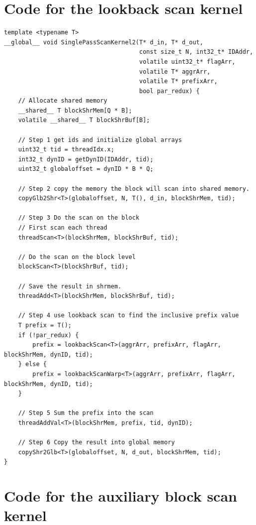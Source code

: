 \documentclass[twocolumn]{article}
\begin{document}
\newpage

\section{Code for the lookback scan kernel}

\begin{lstlisting}[caption=Lookback kernel,label=lst:lookbackKernel]
template <typename T>
__global__ void SinglePassScanKernel2(T* d_in, T* d_out,
                                      const size_t N, int32_t* IDAddr,
                                      volatile uint32_t* flagArr,
                                      volatile T* aggrArr,
                                      volatile T* prefixArr,
                                      bool par_redux) {
    // Allocate shared memory
    __shared__ T blockShrMem[Q * B];
    volatile __shared__ T blockShrBuf[B];

    // Step 1 get ids and initialize global arrays
    uint32_t tid = threadIdx.x;
    int32_t dynID = getDynID(IDAddr, tid);
    uint32_t globaloffset = dynID * B * Q;

    // Step 2 copy the memory the block will scan into shared memory.
    copyGlb2Shr<T>(globaloffset, N, T(), d_in, blockShrMem, tid);

    // Step 3 Do the scan on the block
    // First scan each thread
    threadScan<T>(blockShrMem, blockShrBuf, tid);

    // Do the scan on the block level
    blockScan<T>(blockShrBuf, tid);

    // Save the result in shrmem.
    threadAdd<T>(blockShrMem, blockShrBuf, tid);

    // Step 4 use lookback scan to find the inclusive prefix value
	T prefix = T();
	if (!par_redux) {
		prefix = lookbackScan<T>(aggrArr, prefixArr, flagArr, blockShrMem, dynID, tid);
	} else {
		prefix = lookbackScanWarp<T>(aggrArr, prefixArr, flagArr, blockShrMem, dynID, tid);
	}

    // Step 5 Sum the prefix into the scan
    threadAddVal<T>(blockShrMem, prefix, tid, dynID);

    // Step 6 Copy the result into global memory
    copyShr2Glb<T>(globaloffset, N, d_out, blockShrMem, tid);
}
\end{lstlisting}

\newpage

\section{Code for the auxiliary block scan kernel}
\end{document}
